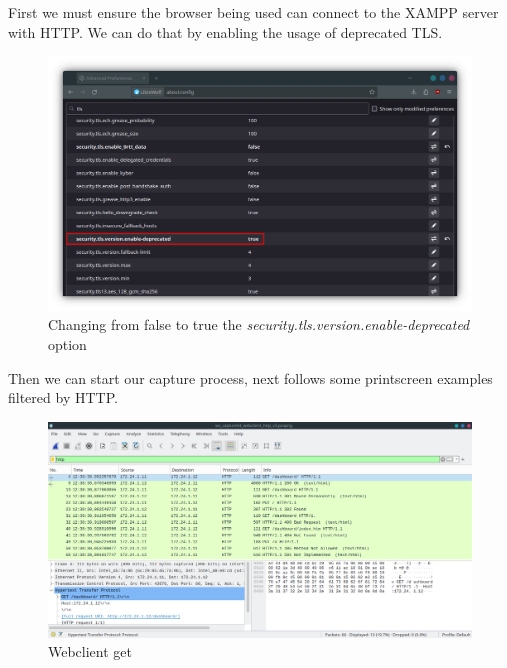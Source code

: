 \documentclass[11pt,a4paper]{report}
\begin{document}
        \begin{flushleft}
            First we must ensure the browser being used can connect to the XAMPP server with HTTP. We can do that by enabling the usage of deprecated TLS.
            \begin{figure}[h]
                \centering
                \includegraphics[scale=0.4]{librewolf_tls} 
                \caption{Changing from false to true the \textit{security.tls.version.enable-deprecated} option}
                \label{fig:librewolf}
            \end{figure}

            Then we can start our capture process, next follows some printscreen examples filtered by HTTP.
            \begin{flushleft}
                \begin{figure}[!h]
                    \centering
                    \includegraphics[scale=0.43]{wscapwcsocket05} %
                    \caption{Webclient get} \label{fig:wireshark1}
                \end{figure}
                

\end{flushleft}
\end{flushleft}
\end{document}
